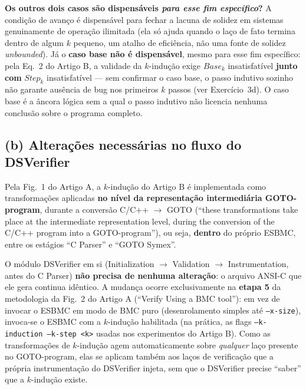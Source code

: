 \documentclass[12pt,a4paper]{article}
\newcommand{\vv}[1]{\texttt{#1}}
\begin{document}
\begin{tcolorbox}[notabox]
\textbf{Os outros dois casos s\~ao dispens\'aveis \emph{para esse fim espec\'ifico}?}
A condi\c{c}\~ao de avan\c{c}o \'e dispens\'avel para fechar a lacuna de solidez em sistemas
genuinamente de opera\c{c}\~ao ilimitada (ela s\'o ajuda quando o la\c{c}o de fato termina
dentro de algum $k$ pequeno, um atalho de efici\^encia, n\~ao uma fonte de solidez
\emph{unbounded}). J\'a o \textbf{caso base n\~ao \'e dispens\'avel}, mesmo para esse fim
espec\'ifico: pela Eq.~2 do Artigo B, a validade da $k$-indu\c{c}\~ao exige $Base_k$ insatisfat\'ivel
\textbf{junto com} $Step_k$ insatisfat\'ivel --- sem confirmar o caso base, o passo indutivo
sozinho n\~ao garante aus\^encia de bug nos primeiros $k$ passos (ver Exerc\'icio~3d). O caso
base \'e a \^ancora l\'ogica sem a qual o passo indutivo n\~ao licencia nenhuma conclus\~ao
sobre o programa completo.
\end{tcolorbox}

\subsection{(b) Alterações necessárias no fluxo do DSVerifier}

Pela Fig.~1 do Artigo A, a $k$-indu\c{c}\~ao do Artigo B \'e implementada como transforma\c{c}\~oes
aplicadas \textbf{no n\'ivel da representa\c{c}\~ao intermedi\'aria GOTO-program}, durante a
convers\~ao C/C++ $\to$ GOTO (``these transformations take place at the intermediate
representation level, during the conversion of the C/C++ program into a GOTO-program''), ou
seja, \textbf{dentro} do pr\'oprio ESBMC, entre os est\'agios ``C Parser'' e ``GOTO Symex''.

\begin{tcolorbox}[resultbox]
O m\'odulo DSVerifier em si (Initialization $\to$ Validation $\to$ Instrumentation, antes do
C Parser) \textbf{n\~ao precisa de nenhuma altera\c{c}\~ao}: o arquivo ANSI-C que ele gera
continua id\^entico. A mudan\c{c}a ocorre exclusivamente na \textbf{etapa 5} da metodologia da
Fig.~2 do Artigo A (``Verify Using a BMC tool''): em vez de invocar o ESBMC em modo de BMC puro
(desenrolamento simples at\'e \vv{--x-size}), invoca-se o ESBMC com a $k$-indu\c{c}\~ao
habilitada (na pr\'atica, as flags \vv{--k-induction --k-step <k>} usadas nos experimentos do
Artigo B). Como as transforma\c{c}\~oes de $k$-indu\c{c}\~ao agem automaticamente sobre
\emph{qualquer} la\c{c}o presente no GOTO-program, elas se aplicam tamb\'em aos la\c{c}os de
verifica\c{c}\~ao que a pr\'opria instrumenta\c{c}\~ao do DSVerifier injeta, sem que o
DSVerifier precise ``saber'' que a $k$-indu\c{c}\~ao existe.
\end{tcolorbox}
\end{document}
